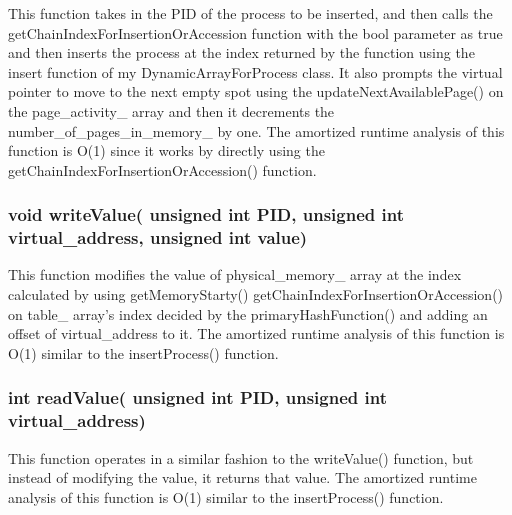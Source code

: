 \documentclass[a4paper]{article}
\begin{document}
    This function takes in the {\color{draculapurple}PID} of the process to be inserted, and then calls the {\color{draculapurple}getChainIndexForInsertionOrAccession} function with the
            {\color{orange}bool} parameter as {\color{LightPink}true} and then inserts the process at the index returned by the function using the {\color{draculapurple}insert} function of my {\color{draculapurple}DynamicArrayForProcess} class.
    It also prompts the virtual pointer to move to the next empty spot using the {\color{draculapurple}updateNextAvailablePage()}
    on the {\color{Turquoise}page\_activity\_} array and then it decrements the {\color{Turquoise}number\_of\_pages\_in\_memory\_} by one.
    The amortized runtime analysis of this function is {\color{lightblue}O(1)} since it works by directly using the {\color{draculapurple}getChainIndexForInsertionOrAccession()} function.

    \subsubsection{{\color{orange}void} {\color{draculapurple}writeValue}({\color{orange} unsigned int} PID, {\color{orange}unsigned int} virtual\_address, {\color{orange}unsigned int} value)}
    This function modifies the value of {\color{Turquoise}physical\_memory\_} array at the index calculated by using
            {\color{draculapurple}getMemoryStarty()} {\color{draculapurple}getChainIndexForInsertionOrAccession()} on
            {\color{Turquoise}table\_} array's index decided by the {\color{draculapurple}primaryHashFunction()} and adding an
    offset of {\color{Turquoise}virtual\_address} to it. The amortized runtime analysis of this function is {\color{lightblue}O(1)} similar to the {\color{draculapurple}insertProcess()} function.

    \subsubsection{{\color{orange}int} {\color{draculapurple}readValue}({\color{orange} unsigned int} PID, {\color{orange}unsigned int} virtual\_address)}
    This function operates in a similar fashion to the {\color{draculapurple}writeValue()} function, but instead of
    modifying the value, it returns that value. The amortized runtime analysis of this function is
            {\color{lightblue}O(1)} similar to the {\color{draculapurple}insertProcess()} function.
\end{document}
